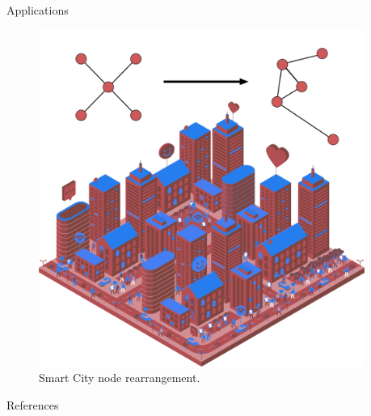 \documentclass[final]{beamer}
\newlength{\sepwidthB}
\newlength{\colwidthB}
\newcommand{\separatorcolumnB}{\begin{column}{\sepwidthB}\end{column}}
\begin{document}
\begin{frame}[t]
\begin{columns}
\begin{column}[T]{\colwidthB}
\begin{block}{Applications}
        \begin{figure}[!Ht]
            \centering
                \includegraphics[width=0.7\linewidth]{Figures/smart-city-app.png}
                \caption{Smart City node rearrangement.}
                \label{fig:app}
        \end{figure}
    \end{block}

  

    

\begin{block}{References}

\nocite{*}

\end{block} 

\end{column}
\separatorcolumnB
\end{columns}
\end{frame}
\end{document}
